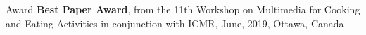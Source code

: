 \begin{rSection}{Award}
{\bf Best Paper Award}, from the 11th Workshop on Multimedia for Cooking and Eating Activities in conjunction with ICMR, June, 2019, Ottawa, Canada
\end{rSection}